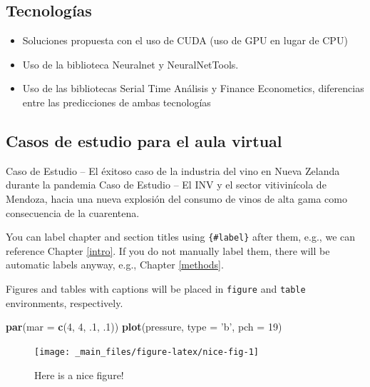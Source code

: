 \documentclass[]{article}
\newenvironment{Shaded}{\begin{snugshade}}{\end{snugshade}}
\newcommand{\KeywordTok}[1]{\textcolor[rgb]{0.13,0.29,0.53}{\textbf{#1}}}
\newcommand{\DataTypeTok}[1]{\textcolor[rgb]{0.13,0.29,0.53}{#1}}
\newcommand{\DecValTok}[1]{\textcolor[rgb]{0.00,0.00,0.81}{#1}}
\newcommand{\StringTok}[1]{\textcolor[rgb]{0.31,0.60,0.02}{#1}}
\newcommand{\NormalTok}[1]{#1}
\providecommand{\tightlist}{%
  \setlength{\itemsep}{0pt}\setlength{\parskip}{0pt}}
\begin{document}
\subsection{Tecnologías}\label{tecnologuxedas}

\begin{itemize}
\tightlist
\item
  Soluciones propuesta con el uso de CUDA (uso de GPU en lugar de CPU)
\item
  Uso de la biblioteca Neuralnet y NeuralNetTools.
\item
  Uso de las bibliotecas Serial Time Análisis y Finance Econometics,
  diferencias entre las predicciones de ambas tecnologías
\end{itemize}

\subsection{Casos de estudio para el aula
virtual}\label{casos-de-estudio-para-el-aula-virtual}

Caso de Estudio -- El éxitoso caso de la industria del vino en Nueva
Zelanda durante la pandemia Caso de Estudio -- El INV y el sector
vitivinícola de Mendoza, hacia una nueva explosión del consumo de vinos
de alta gama como consecuencia de la cuarentena.

You can label chapter and section titles using \texttt{\{\#label\}}
after them, e.g., we can reference Chapter \ref{intro}. If you do not
manually label them, there will be automatic labels anyway, e.g.,
Chapter \ref{methods}.

Figures and tables with captions will be placed in \texttt{figure} and
\texttt{table} environments, respectively.

\begin{Shaded}
\begin{Highlighting}[]
\KeywordTok{par}\NormalTok{(}\DataTypeTok{mar =} \KeywordTok{c}\NormalTok{(}\DecValTok{4}\NormalTok{, }\DecValTok{4}\NormalTok{, .}\DecValTok{1}\NormalTok{, .}\DecValTok{1}\NormalTok{))}
\KeywordTok{plot}\NormalTok{(pressure, }\DataTypeTok{type =} \StringTok{'b'}\NormalTok{, }\DataTypeTok{pch =} \DecValTok{19}\NormalTok{)}
\end{Highlighting}
\end{Shaded}

\begin{figure}

{\centering \texttt{[image: \_main\_files/figure-latex/nice-fig-1]} 

}

\caption{Here is a nice figure!}\label{fig:nice-fig}
\end{figure}
\end{document}
